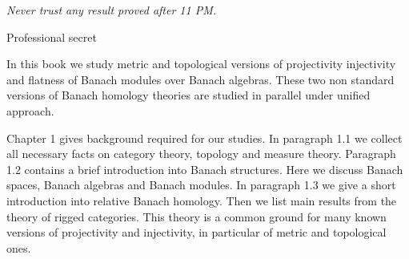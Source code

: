 \documentclass[11pt, a4paper, oneside]{thbook}
\begin{document}
\pagestyle{empty} 

\null\vfill 

\textit{Never trust any result proved after 11 PM.}

\begin{flushright}
Professional secret
\end{flushright}

\vfill\vfill\vfill\vfill\vfill\vfill\null{}

\clearpage %




In this book we study metric and topological versions of projectivity
injectivity and flatness of Banach modules over Banach algebras. These two non
standard versions of Banach homology theories are studied in parallel under
unified approach.

Chapter 1 gives background required for our studies. In paragraph 1.1 we collect
all necessary facts on category theory, topology and measure theory. Paragraph
1.2 contains a brief introduction into Banach structures. Here we discuss Banach
spaces, Banach algebras and Banach modules. In paragraph 1.3 we give a short
introduction into relative Banach homology. Then we list main results from the
theory of rigged categories. This theory is a common ground for many known
versions of projectivity and injectivity, in particular of metric and
topological ones.
\end{document}
